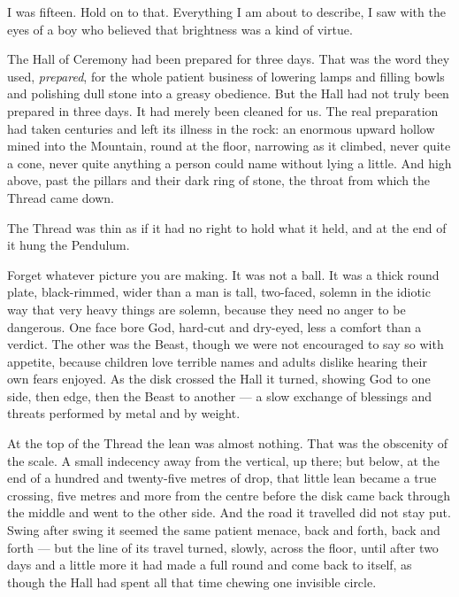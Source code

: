 I was fifteen. Hold on to that. Everything I am about to describe, I saw with the eyes of a boy who believed that brightness was a kind of virtue.\par

\ornament

The Hall of Ceremony had been prepared for three days. That was the word they used, \textit{prepared}, for the whole patient business of lowering lamps and filling bowls and polishing dull stone into a greasy obedience. But the Hall had not truly been prepared in three days. It had merely been cleaned for us. The real preparation had taken centuries and left its illness in the rock: an enormous upward hollow mined into the Mountain, round at the floor, narrowing as it climbed, never quite a cone, never quite anything a person could name without lying a little. And high above, past the pillars and their dark ring of stone, the throat from which the Thread came down.\par

The Thread was thin as if it had no right to hold what it held, and at the end of it hung the Pendulum.\par

Forget whatever picture you are making. It was not a ball. It was a thick round plate, black-rimmed, wider than a man is tall, two-faced, solemn in the idiotic way that very heavy things are solemn, because they need no anger to be dangerous. One face bore God, hard-cut and dry-eyed, less a comfort than a verdict. The other was the Beast, though we were not encouraged to say so with appetite, because children love terrible names and adults dislike hearing their own fears enjoyed. As the disk crossed the Hall it turned, showing God to one side, then edge, then the Beast to another --- a slow exchange of blessings and threats performed by metal and by weight.\par

At the top of the Thread the lean was almost nothing. That was the obscenity of the scale. A small indecency away from the vertical, up there; but below, at the end of a hundred and twenty-five metres of drop, that little lean became a true crossing, five metres and more from the centre before the disk came back through the middle and went to the other side. And the road it travelled did not stay put. Swing after swing it seemed the same patient menace, back and forth, back and forth --- but the line of its travel turned, slowly, across the floor, until after two days and a little more it had made a full round and come back to itself, as though the Hall had spent all that time chewing one invisible circle.\par

